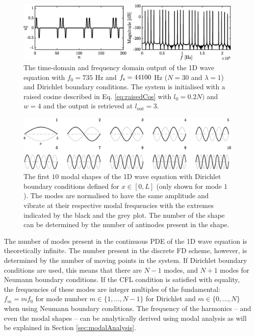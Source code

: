 \begin{figure}[h]
    \includegraphics[width=\textwidth]{figures/fdtd/oneDWaveOutput.eps}
    \caption{The time-domain and frequency domain output of the 1D wave equation with $f_0 = 735$ Hz and $f_\text{s} = 44100$ Hz ($N = 30$ and $\lambda = 1$) and Dirichlet boundary conditions. The system is initialised with a raised cosine described in Eq. \eqref{eq:raisedCos} with $l_0 = 0.2N)$ and $w=4$ and the output is retrieved at $l_\text{out} = 3$. \label{fig:1DWaveOutput}}
\end{figure}

\begin{figure}[h]
    \includegraphics[width=\textwidth]{figures/fdtd/modes.eps}
    \caption{The first $10$ modal shapes of the 1D wave equation with Dirichlet boundary conditions defined for $x\in[0, L]$ (only shown for mode $1$). The modes are normalised to have the same amplitude and vibrate at their respective modal frequencies with the extremes indicated by the black and the grey plot. The number of the shape can be determined by the number of antinodes present in the shape. \label{fig:modes}}
\end{figure}

The number of modes present in the continuous PDE of the 1D wave equation is theoretically infinite. The number present in the discrete FD scheme, however, is determined by the number of moving points in the system. If Dirichlet boundary conditions are used, this means that there are $N-1$ modes, and $N+1$ modes for Neumann boundary conditions. If the CFL condition is satisfied with equality, the frequencies of these modes are integer multiples of the fundamental: $f_m = mf_0$ for mode number $m \in \{1, \hdots, N-1\}$ for Dirichlet and $m \in \{0, \hdots, N\}$ when using Neumann boundary conditions. The frequency of the harmonics -- and even the modal shapes -- can be analytically derived using modal analysis as will be explained in Section \ref{sec:modalAnalysis}.

